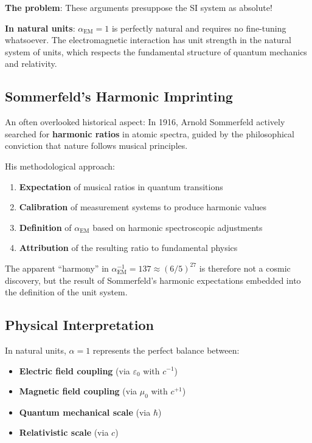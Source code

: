 \textbf{The problem}: These arguments presuppose the SI system as absolute!

\textbf{In natural units}: $\alpha_{\text{EM}} = 1$ is perfectly natural and requires no fine-tuning whatsoever. The electromagnetic interaction has unit strength in the natural system of units, which respects the fundamental structure of quantum mechanics and relativity.

\subsection{Sommerfeld's Harmonic Imprinting}
\label{subsec:sommerfeld_harmonic}

An often overlooked historical aspect: In 1916, Arnold Sommerfeld actively searched for \textbf{harmonic ratios} in atomic spectra, guided by the philosophical conviction that nature follows musical principles.

His methodological approach:
\begin{enumerate}
	\item \textbf{Expectation} of musical ratios in quantum transitions
	\item \textbf{Calibration} of measurement systems to produce harmonic values
	\item \textbf{Definition} of $\alpha_{\text{EM}}$ based on harmonic spectroscopic adjustments
	\item \textbf{Attribution} of the resulting ratio to fundamental physics
\end{enumerate}

The apparent ``harmony'' in $\alpha_{\text{EM}}^{-1} = 137 \approx (6/5)^{27}$ is therefore not a cosmic discovery, but the result of Sommerfeld's harmonic expectations embedded into the definition of the unit system.

\subsection{Physical Interpretation}
\label{subsec:physical_interpretation}

In natural units, $\alpha = 1$ represents the perfect balance between:

\begin{itemize}
	\item \textbf{Electric field coupling} (via $\varepsilon_0$ with $c^{-1}$)
	\item \textbf{Magnetic field coupling} (via $\mu_0$ with $c^{+1}$)
	\item \textbf{Quantum mechanical scale} (via $\hbar$)
	\item \textbf{Relativistic scale} (via $c$)
\end{itemize}

